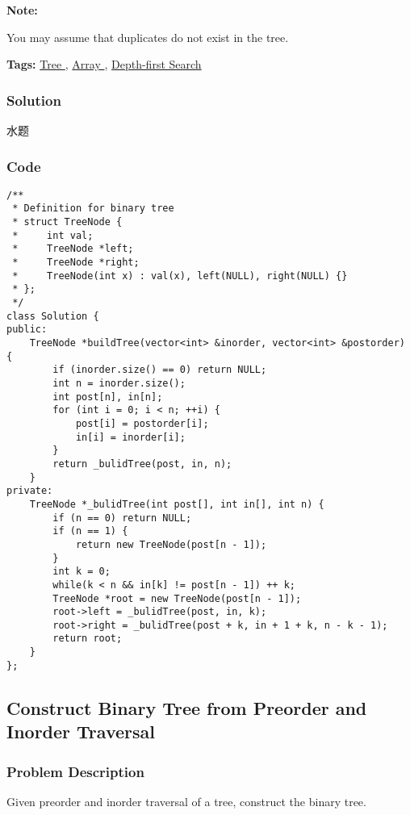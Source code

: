 \documentclass{article}
\begin{document}
\begin{CJK*}{UTF8}{gkai}
\textbf{Note:}


You may assume that duplicates do not exist in the tree.


\textbf{Tags: }
\hyperref[ Tree ]{ Tree },  \hyperref[ Array ]{ Array },  \hyperref[ Depth-first Search ]{ Depth-first Search }



\subsubsection*{Solution}
水题

\subsubsection*{Code}
\begin{lstlisting}
/**
 * Definition for binary tree
 * struct TreeNode {
 *     int val;
 *     TreeNode *left;
 *     TreeNode *right;
 *     TreeNode(int x) : val(x), left(NULL), right(NULL) {}
 * };
 */
class Solution {
public:
    TreeNode *buildTree(vector<int> &inorder, vector<int> &postorder) {
        if (inorder.size() == 0) return NULL;
        int n = inorder.size();
        int post[n], in[n];
        for (int i = 0; i < n; ++i) {
            post[i] = postorder[i];
            in[i] = inorder[i];
        }
        return _bulidTree(post, in, n);
    }
private:
    TreeNode *_bulidTree(int post[], int in[], int n) {
        if (n == 0) return NULL;
        if (n == 1) {
            return new TreeNode(post[n - 1]);
        }
        int k = 0;
        while(k < n && in[k] != post[n - 1]) ++ k;
        TreeNode *root = new TreeNode(post[n - 1]);
        root->left = _bulidTree(post, in, k);
        root->right = _bulidTree(post + k, in + 1 + k, n - k - 1);
        return root;
    }
}; 
\end{lstlisting}


\subsection{ Construct Binary Tree from Preorder and Inorder Traversal }
\label{ Construct Binary Tree from Preorder and Inorder Traversal }

\subsubsection*{Problem Description}
Given preorder and inorder traversal of a tree, construct the binary tree.


\end{CJK*}
\end{document}

